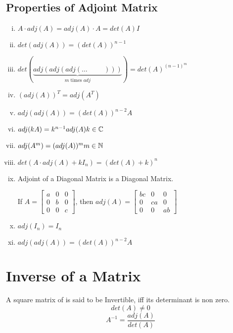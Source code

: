 \documentclass{article}
\begin{document}
\subsection{Properties of Adjoint Matrix}
\begin{enumerate}[i.]
    \item $A \cdot adj(A)= adj(A) \cdot A= det(A) I $
    \item $det(adj(A))=\left(det(A)\right)^{n-1}$
    \item $det(\underbrace{adj(adj(adj( \ldots \hspace{1cm})))}_{m \text{ times } adj})=det(A)^{\left(n-1\right)^{m}}$
    \item $\left(adj(A)\right)^T=adj(A^T)$
    \item $adj(adj(A))=(det(A))^{n-2}A$
    \item $adj(kA)=k^{n-1}adj(A) \hfill k \in \mathbb{C}$
    \item $adj(A^m)=(adj(A))^m \hfill m \in \mathbb{N}$
    \item $det(A \cdot adj(A)+kI_{n})=\left(det(A)+k\right)^n$
    \item Adjoint of a Diagonal Matrix is a Diagonal Matrix.

          If $A= {\begin{bmatrix}
                  a & 0 & 0 \\
                  0 & b & 0 \\
                  0 & 0 & c
              \end{bmatrix}} $, then $adj(A)=\begin{bmatrix}
                  bc & 0  & 0  \\
                  0  & ca & 0  \\
                  0  & 0  & ab
              \end{bmatrix}$
    \item $adj(I_{n})=I_{n}$
    \item $adj(adj(A))=\left(det(A)\right)^{n-2}A$
\end{enumerate}

\section{Inverse of a Matrix}
A square matrix of is said to be Invertible, iff its determinant is non zero.
$$det(A)\not=0$$
$$A^{-1}=\dfrac{adj(A)}{det(A)}$$
\end{document}
